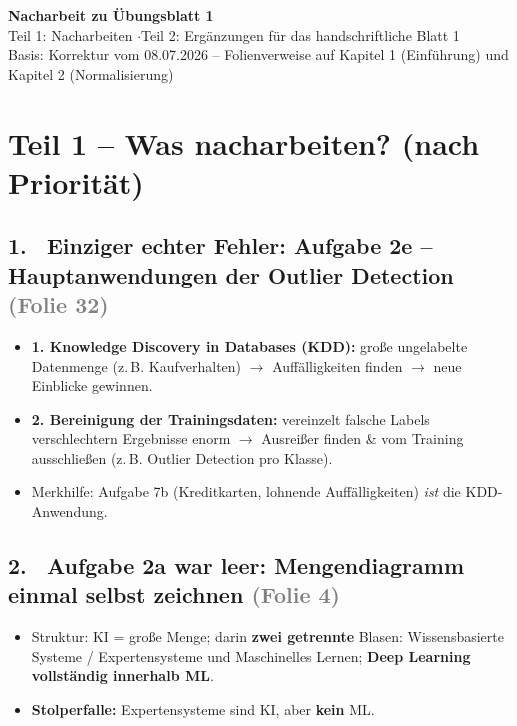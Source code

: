\documentclass[10pt,a4paper]{article}
\newcommand{\stolper}{\textcolor{ampelrot}{\textbf{Stolperfalle:}} }
\newcommand{\folie}[1]{\textcolor{gray}{\footnotesize(#1)}}
\newcommand{\checkbox}{\raisebox{-1pt}{\fbox{\rule{0pt}{7pt}\rule{7pt}{0pt}}}\hspace{6pt}}
\begin{document}
\begin{center}
  {\Large\bfseries Nacharbeit zu Übungsblatt 1}\\[4pt]
  {\large Teil 1: Nacharbeiten \quad$\cdot$\quad Teil 2: Ergänzungen für das handschriftliche Blatt \textcircled{\small 1}}\\[4pt]
  \small Basis: Korrektur vom 08.07.2026 -- Folienverweise auf Kapitel 1 (Einführung) und Kapitel 2 (Normalisierung)
\end{center}

\section*{Teil 1 -- Was nacharbeiten? (nach Priorität)}

\subsection*{1. \ Einziger echter Fehler: Aufgabe 2e -- Hauptanwendungen der Outlier Detection \folie{Folie 32}}
\begin{itemize}
  \item[\checkbox] \textbf{1. Knowledge Discovery in Databases (KDD):} große ungelabelte Datenmenge (z.\,B. Kaufverhalten) $\to$ Auffälligkeiten finden $\to$ neue Einblicke gewinnen.
  \item[\checkbox] \textbf{2. Bereinigung der Trainingsdaten:} vereinzelt falsche Labels verschlechtern Ergebnisse enorm $\to$ Ausreißer finden \& vom Training ausschließen (z.\,B. Outlier Detection pro Klasse).
  \item Merkhilfe: Aufgabe 7b (Kreditkarten, \glqq lohnende Auffälligkeiten\grqq) \emph{ist} die KDD-Anwendung.
\end{itemize}

\subsection*{2. \ Aufgabe 2a war leer: Mengendiagramm einmal selbst zeichnen \folie{Folie 4}}
\begin{itemize}
  \item[\checkbox] Struktur: KI = große Menge; darin \textbf{zwei getrennte} Blasen: \glqq Wissensbasierte Systeme / Expertensysteme\grqq{} und \glqq Maschinelles Lernen\grqq; \textbf{Deep Learning vollständig innerhalb ML}.
  \item \stolper Expertensysteme sind KI, aber \textbf{kein} ML.
\end{itemize}
\end{document}
